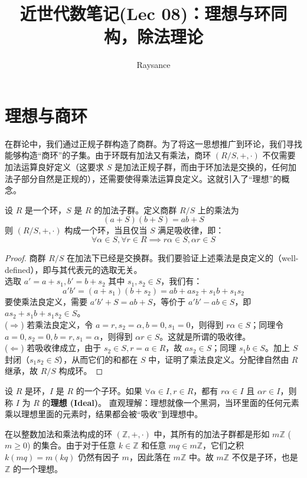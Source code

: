 \documentclass[11pt]{article}
\title{近世代数笔记(Lec 08)：理想与环同构，除法理论}
\author{Raysance}
\date{}
\begin{document}
\maketitle

\section{理想与商环}

在群论中，我们通过正规子群构造了商群。为了将这一思想推广到环论，我们寻找能够构造“商环”的子集。由于环既有加法又有乘法，商环 $(R/S, +, \cdot)$ 不仅需要加法运算良好定义（这要求 $S$ 是加法正规子群，而由于环加法是交换的，任何加法子部分自然是正规的），还需要使得乘法运算良定义。这就引入了“理想”的概念。

\begin{cntheorem}
设 $R$ 是一个环，$S$ 是 $R$ 的加法子群。定义商群 $R/S$ 上的乘法为 
$$ (a+S)(b+S) = ab + S $$
则 $(R/S, +, \cdot)$ 构成一个环，当且仅当 $S$ 满足吸收律，即：
$$ \forall \alpha \in S, \forall r \in R \implies r\alpha \in S, \alpha r \in S $$
\end{cntheorem}
\begin{proof}
商群 $R/S$ 在加法下已经是交换群。我们要验证上述乘法是良定义的（well-defined），即与其代表元的选取无关。\\
选取 $a' = a + s_1, b' = b + s_2$ 其中 $s_1, s_2 \in S$，我们有：
$$ a'b' = (a+s_1)(b+s_2) = ab + as_2 + s_1b + s_1s_2 $$
要使乘法良定义，需要 $a'b' + S = ab + S$，等价于 $a'b' - ab \in S$，即 $as_2 + s_1b + s_1s_2 \in S$。\\
($\Rightarrow$) 若乘法良定义，令 $a=r, s_2=\alpha, b=0, s_1=0$，则得到 $r\alpha \in S$；同理令 $a=0, s_2=0, b=r, s_1=\alpha$，则得到 $\alpha r \in S$。这就是所谓的吸收律。\\
($\Leftarrow$) 若吸收律成立，由于 $s_2 \in S, r=a \in R$，故 $as_2 \in S$；同理 $s_1b \in S$。加上 $S$ 封闭（$s_1 s_2 \in S$），从而它们的和都在 $S$ 中，证明了乘法良定义。分配律自然由 $R$ 继承，故 $R/S$ 构成环。
\end{proof}

\begin{cndefinition}
设 $R$ 是环，$I$ 是 $R$ 的一个子环。如果 $\forall \alpha \in I, r \in R$，都有 $r\alpha \in I$ 且 $\alpha r \in I$，则称 $I$ 为 $R$ 的\textbf{理想 (Ideal)}。
直观理解：理想就像一个黑洞，当环里面的任何元素乘以理想里面的元素时，结果都会被“吸收”到理想中。
\end{cndefinition}

\begin{cnexample}
在以整数加法和乘法构成的环 $(\mathbb{Z}, +, \cdot)$ 中，其所有的加法子群都是形如 $m\mathbb{Z}$ ($m \ge 0$) 的集合。由于对于任意 $k \in \mathbb{Z}$ 和任意 $mq \in m\mathbb{Z}$，它们之积 $k(mq) = m(kq)$ 仍然有因子 $m$，因此落在 $m\mathbb{Z}$ 中。故 $m\mathbb{Z}$ 不仅是子环，也是 $\mathbb{Z}$ 的一个理想。
\end{cnexample}
\end{document}
